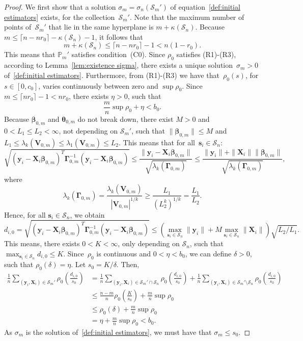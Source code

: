 \documentclass{article}
\numberwithin{equation}{section}
\theoremstyle{plain}
\newcommand{\bbeta}{\bm\beta}
\newcommand{\btheta}{\bm\theta}
\newcommand{\bGamma}{\bm\Gamma}
\newcommand{\by}{\mathbf{y}}
\newcommand{\bs}{\mathbf{s}}
\newcommand{\bX}{\mathbf{X}}
\newcommand{\bV}{\mathbf{V}}
\begin{document}
\begin{proof}
We first show that a solution $\sigma_m=\sigma_n(\mathcal{S}_m')$ of
equation~\eqref{def:initial estimators} exists, for the collection~$\mathcal{S}_m'$.
Note that the maximum number of points of~$\mathcal{S}_m'$ that lie in the same hyperplane 
is $m+\kappa(\mathcal{S}_n)$.
Because $m\leq \lceil n-nr_0\rceil-\kappa(\mathcal{S}_n)-1$, it follows that
\[
m+\kappa(\mathcal{S}_n)
\leq
\lceil n-nr_0\rceil-1
<
n(1-r_0).
\]
This means that $\mathbb{P}_m'$ satisfies condition~(C0).
Since $\rho_0$ satisfies (R1)-(R3), according to Lemma~\ref{lem:existence sigma},
there exists a unique solution~$\sigma_m>0$ of~\eqref{def:initial estimators}.
Furthermore, from (R1)-(R3) we have that~$\rho_0(s)$, for $s\in[0,c_0]$, 
varies continuously between zero and $\sup\rho_0$.
Since $m\leq \lceil nr_0\rceil-1<nr_0$, there exists $\eta>0$, such that
\[
\frac{m}{n}\sup\rho_0+\eta<b_0.
\]
Because $\bbeta_{0,m}$ and $\btheta_{0,m}$ do not break down, there exist $M>0$ and $0<L_1\leq L_2<\infty$,
not depending on $\mathcal{S}_m'$,
such that $\|\bbeta_{0,m}\|\leq M$ and $L_1\leq \lambda_{k}(\bV_{0,m})\leq \lambda_{1}(\bV_{0,m})\leq L_2$.
This means that for all~$\bs_i\in \mathcal{S}_n$:
\[
\sqrt{(\by_i-\bX_i\bbeta_{0,m})^T\bGamma_{0,m}^{-1}(\by_i-\bX_i\bbeta_{0,m})}
\leq
\frac{\|\by_i-\bX_i\bbeta_{0,m}\|}{\sqrt{\lambda_k(\bGamma_{0,m})}}
\leq
\frac{\|\by_i\|+\|\bX_i\|\|\bbeta_{0,m}\|}{\sqrt{\lambda_k(\bGamma_{0,m})}},
\]
where
\[
\lambda_k(\bGamma_{0,m})
=
\frac{\lambda_k(\bV_{0,m})}{|\bV_{0,m}|^{1/k}}
\geq
\frac{L_1}{(L_2^k)^{1/k}}=\frac{L_1}{L_2}.
\]
Hence, for all $\bs_i\in \mathcal{S}_n$, we obtain
\[
d_{i,0}=\sqrt{(\by_i-\bX_i\bbeta_{0,m})^T\bGamma_{0,m}^{-1}(\by_i-\bX_i\bbeta_{0,m})}
\leq
\left(
\max_{\bs_i\in \mathcal{S}_n}\|\by_i\|
+
M
\max_{\bs_i\in \mathcal{S}_n}\|\bX_i\|
\right)
\sqrt{L_2/L_1}.
\]
This means, there exists $0<K<\infty$, only depending on $\mathcal{S}_n$,
such that $\max_{\bs_i\in \mathcal{S}_n}d_{i,0}\leq K$.
Since~$\rho_0$ is continuous and $0<\eta<b_0$, we can define $\delta>0$, such that $\rho_0(\delta)=\eta$.
Let $s_0=K/\delta$.
Then,
\[
\begin{split}
\frac1n
\sum_{(\by_i,\bX_i)\in \mathcal{S}_m'}
\rho_0
\left(
\frac{d_{i,0}}{s_0}
\right)
&=
\frac1n
\sum_{(\by_i,\bX_i)\in \mathcal{S}_m'\cap \mathcal{S}_n}
\rho_0
\left(
\frac{d_{i,0}}{s_0}
\right)
+
\frac1n
\sum_{(\by_i,\bX_i)\in \mathcal{S}_m'\setminus\mathcal{S}_n}
\rho_0
\left(
\frac{d_{i,0}}{s_0}
\right)\\
&\leq
\frac{n-m}{n}\rho_0
\left(
\frac{K}{s_0}
\right)
+
\frac{m}{n}\sup\rho_0\\
&\leq
\rho_0(\delta)+\frac{m}{n}\sup\rho_0\\
&=
\eta+\frac{m}{n}\sup\rho_0<b_0.
\end{split}
\]
As $\sigma_m$ is the solution of~\eqref{def:initial estimators}, 
we must have that $\sigma_m\leq s_0$.


\end{proof}
\end{document}
